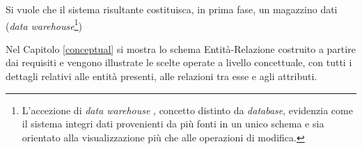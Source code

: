 Si vuole che il sistema risultante costituisca, in prima fase, un magazzino dati (\emph{data warehouse}\footnote{
    L'accezione di \emph{data warehouse} \cite{Ded16}, concetto distinto da \emph{database}, evidenzia come il sistema integri dati provenienti da più fonti in un unico schema e sia orientato alla visualizzazione più che alle operazioni di modifica.
})

Nel Capitolo \ref{conceptual} si mostra lo schema Entità-Relazione costruito a partire dai requisiti e vengono illustrate le scelte operate a livello concettuale, con tutti i dettagli relativi alle entità presenti, alle relazioni tra esse e agli attributi.
